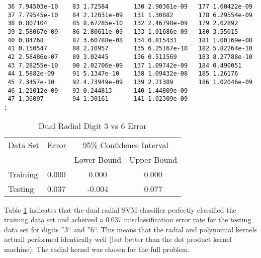 \documentclass{article}
\begin{document}
\begin{verbatim}
 36 7.94503e-10    83 1.72584       130 2.90361e-09   177 1.60422e-09
 37 7.79545e-10    84 2.12031e-09   131 1.30882       178 6.29554e-09
 38 0.807104       85 8.67285e-10   132 2.46798e-09   179 2.02892
 39 2.58067e-09    86 2.80611e-09   133 1.01686e-09   180 3.55015
 40 0.84768        87 3.60788e-08   134 0.815431      181 1.00169e-08
 41 0.150547       88 2.10957       135 6.25167e-10   182 5.82264e-10
 42 2.58486e-07    89 3.02445       136 0.511569      183 8.27788e-10
 43 7.28255e-10    90 2.02706e-09   137 1.09742e-09   184 0.490051
 44 1.5882e-09     91 5.1347e-10    138 1.09432e-08   185 1.26176
 45 7.3457e-10     92 4.73949e-09   139 2.71389       186 1.02046e-09
 46 1.21012e-09    93 0.244813      140 1.44809e-09
 47 1.36097        94 1.30161       141 1.02309e-09
;

\end{verbatim}

\begin{table}\label{table4}
\caption{Dual Radial Digit 3 vs 6 Error}
\begin{center}
\begin{tabular}{llcc}
\toprule
Data Set & Error & \multicolumn{2}{c}{95\% Confidence Interval} \\
\cmidrule(r){3-4}
& & Lower Bound & Upper Bound \\
\midrule
Training & 0.000 & 0.000 & 0.000 \\
Testing & 0.037 & -0.004 & 0.077 \\
\bottomrule
\end{tabular}
\end{center}
\end{table}

Table \ref{table4} indicates that the dual radial SVM classifier perfectly classified the training data set and acheived a \(0.037\) misclassification error rate for the testing data set for digits ''3`` and ''6``. This means that the radial and polynomial kernels actuall performed identically well (but better than the dot product kernel machine). The radial kernel was chosen for the full problem.
\end{document}
